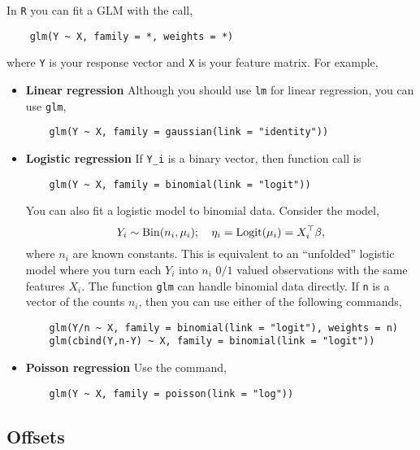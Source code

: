 In \verb|R| you can fit a GLM with the call,
\begin{lstlisting}
    glm(Y ~ X, family = *, weights = *)
\end{lstlisting}
where \verb|Y| is your response vector and \verb|X| is your feature matrix. For example,
\begin{itemize}
    \item {\bf Linear regression} Although you should use \verb|lm| for linear regression, you can use \verb|glm|,
\begin{lstlisting} 
    glm(Y ~ X, family = gaussian(link = "identity")) 
\end{lstlisting}
    \item {\bf Logistic regression} If \verb|Y_i| is a binary vector, then function call is
\begin{lstlisting} 
    glm(Y ~ X, family = binomial(link = "logit")) 
\end{lstlisting}
    You can also fit a logistic model to binomial data. Consider the model,
    \[Y_i \sim \mathrm{Bin}(n_i, \mu_i); \quad \eta_i = \mathrm{Logit}(\mu_i) = X_i^\top \beta, \]
    where $n_i$ are known constants. This is equivalent to an ``unfolded'' logistic model where you turn each $Y_i$ into $n_i$ $0/1$ valued observations with the same features $X_i$. The function \verb|glm| can handle binomial data directly. If \verb|n| is a vector of the counts $n_i$, then you can use either of the following commands,
\begin{lstlisting}
    glm(Y/n ~ X, family = binomial(link = "logit"), weights = n)
    glm(cbind(Y,n-Y) ~ X, family = binomial(link = "logit"))
\end{lstlisting}
\item {\bf Poisson regression} Use the command,
\begin{lstlisting}
    glm(Y ~ X, family = poisson(link = "log"))
\end{lstlisting}
\end{itemize}

\subsection{Offsets}

